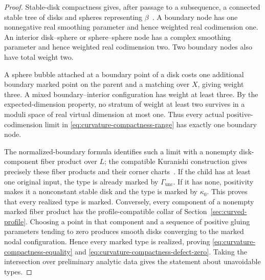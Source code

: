 \documentclass[11pt,letterpaper,twoside]{article}
\theoremstyle{plain}
\theoremstyle{definition}
\theoremstyle{remark}
\let\cite\citep
\begin{document}
\begin{proof}
Stable-disk compactness gives, after passage to a subsequence, a connected stable tree of disks and spheres representing $\beta$~\cite{frauenfelderzehmisch2015}.  A boundary node has one nonnegative real smoothing parameter and hence weighted real codimension one.  An interior disk--sphere or sphere--sphere node has a complex smoothing parameter and hence weighted real codimension two.  Two boundary nodes also have total weight two.

A sphere bubble attached at a boundary point of a disk costs one additional boundary marked point on the parent and a matching over $X$, giving weight three.  A mixed boundary--interior configuration has weight at least three.  By the expected-dimension property, no stratum of weight at least two survives in a moduli space of real virtual dimension at most one.  Thus every actual positive-codimension limit in \eqref{eq:curvature-compactness-range} has exactly one boundary node.

The normalized-boundary formula identifies such a limit with a nonempty disk-component fiber product over $L$; the compatible Kuranishi construction gives precisely these fiber products and their corner charts~\cite{fooo2020}.  If the child has at least one original input, the type is already marked by $\Gamma_{\mathrm{unc}}$.  If it has none, positivity makes it a nonconstant stable disk and the type is marked by $\kappa_0$.  This proves that every realized type is marked.  Conversely, every component of a nonempty marked fiber product has the profile-compatible collar of Section~\ref{sec:curved-profile}.  Choosing a point in that component and a sequence of positive gluing parameters tending to zero produces smooth disks converging to the marked nodal configuration.  Hence every marked type is realized, proving \eqref{eq:curvature-compactness-equality} and \eqref{eq:curvature-compactness-defect-zero}.  Taking the intersection over preliminary analytic data gives the statement about unavoidable types.
\end{proof}
\end{document}

